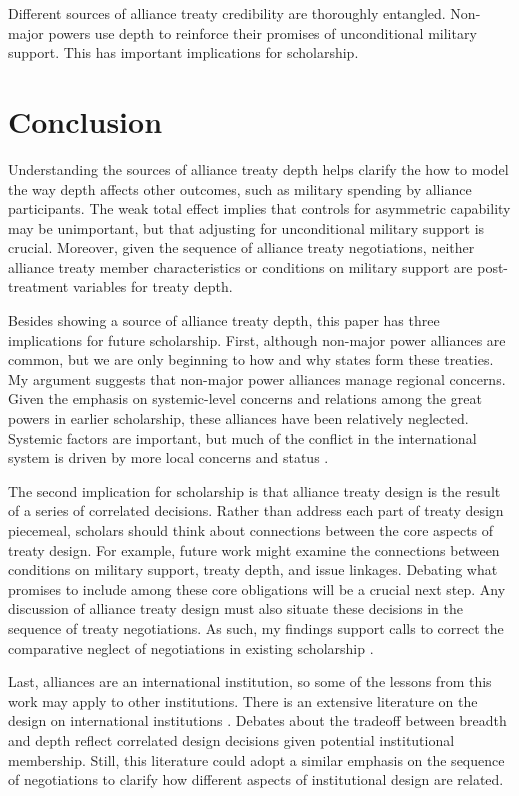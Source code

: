 \documentclass[12pt]{article}
\begin{document}
Different sources of alliance treaty credibility are thoroughly entangled. 
Non-major powers use depth to reinforce their promises of unconditional military support. 
This has important implications for scholarship. 


\section{Conclusion}


Understanding the sources of alliance treaty depth helps clarify the how to model the way depth affects other outcomes, such as military spending by alliance participants. 
The weak total effect implies that controls for asymmetric capability may be unimportant, but that adjusting for unconditional military support is crucial. 
Moreover, given the sequence of alliance treaty negotiations, neither alliance treaty member characteristics or conditions on military support are post-treatment variables for treaty depth. 


Besides showing a source of alliance treaty depth, this paper has three implications for future scholarship. 
First, although non-major power alliances are common, but we are only beginning to how and why states form these treaties. 
My argument suggests that non-major power alliances manage regional concerns. 
Given the emphasis on systemic-level concerns and relations among the great powers in earlier scholarship, these alliances have been relatively neglected. 
Systemic factors are important, but much of the conflict in the international system is driven by more local concerns and status \citep{Renshon2017}. 


The second implication for scholarship is that alliance treaty design is the result of a series of correlated decisions. 
Rather than address each part of treaty design piecemeal, scholars should think about connections between the core aspects of treaty design. 
For example, future work might examine the connections between conditions on military support, treaty depth, and issue linkages.  
Debating what promises to include among these core obligations will be a crucial next step. 
Any discussion of alliance treaty design must also situate these decisions in the sequence of treaty negotiations.
As such, my findings support calls to correct the comparative neglect of negotiations in existing scholarship \citep{Poast2019a}. 


Last, alliances are an international institution, so some of the lessons from this work may apply to other institutions. 
There is an extensive literature on the design on international institutions \citep{DownesRocke1995, MartinSimmons1998, Koremenosetal2001, Koremenos2005, Thompson2010}.
Debates about the tradeoff between breadth and depth \citep{Downsetal1998, Gilligan2004} reflect correlated design decisions given potential institutional membership. 
Still, this literature could adopt a similar emphasis on the sequence of negotiations to clarify how different aspects of institutional design are related. 
\end{document}
